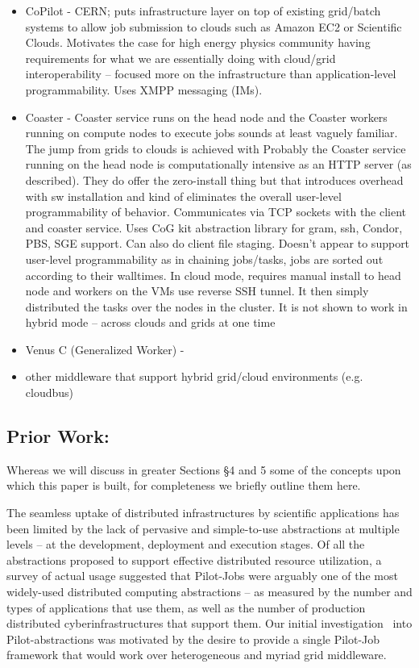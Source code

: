 \documentclass[times]{cpeauth}
\newcommand{\alnote}[1]{ {\textcolor{green} { ***andreL: #1 }}}
\newcommand{\alnote}[1]{}
\newcommand{\pilot}{Pilot\xspace}
\newcommand{\pilotjob}{Pilot-Job\xspace}
\newcommand{\pilotjobs}{Pilot-Jobs\xspace}
\begin{document}
\begin{itemize}

       \item CoPilot - CERN; puts infrastructure layer on top of existing grid/batch systems to allow job submission to clouds such as Amazon EC2 or Scientific Clouds. Motivates the case for high energy physics community having requirements for what we are essentially doing with cloud/grid interoperability -- focused more on the infrastructure than application-level programmability. Uses XMPP messaging (IMs). 
	\item Coaster - Coaster service runs on the head node and the Coaster workers running on compute nodes to execute jobs sounds at least vaguely familiar. The jump from grids to clouds is achieved with  Probably the Coaster service running on the head node is computationally intensive as an  HTTP server (as described). They do offer the zero-install thing but that introduces overhead with sw installation and kind of eliminates the overall user-level programmability of behavior. Communicates via TCP sockets with the client and coaster service. Uses CoG kit abstraction library for gram, ssh, Condor, PBS, SGE support. Can also do client file staging. Doesn't appear to support user-level programmability as in chaining jobs/tasks, jobs are sorted out according to their walltimes. In cloud mode, requires manual install to head node and workers on the VMs use reverse SSH tunnel. It then simply distributed the tasks over the nodes in the cluster. It is not shown to work in hybrid mode -- across clouds and grids at one time
	\item Venus C (Generalized Worker) - 
	\item other middleware that support hybrid grid/cloud environments (e.g. cloudbus)
\end{itemize}

\subsection*{Prior Work:}

Whereas we will discuss in greater Sections \S4 and 5 some of the
concepts upon which this paper is built, for completeness we briefly
outline them here.

 The seamless uptake of distributed
infrastructures by scientific applications has been limited by the
lack of pervasive and simple-to-use abstractions at multiple levels –
at the development, deployment and execution stages. Of all the
abstractions proposed to support effective distributed resource
utilization, a survey of actual usage suggested that \pilotjobs were
arguably one of the most widely-used distributed computing
abstractions – as measured by the number and types of applications
that use them, as well as the number of production distributed
cyberinfrastructures that support them.  Our initial
investigation~\cite{Luckow:2008la} into \pilot-abstractions
was motivated by the desire to provide a single \pilotjob framework
that would work over heterogeneous and myriad grid middleware.
\end{document}
